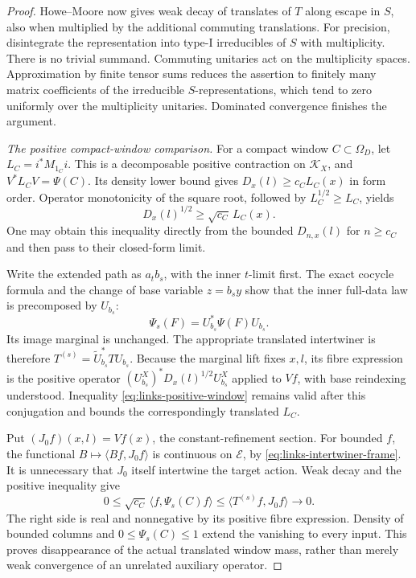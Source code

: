 \begin{proof}
Howe--Moore now gives weak decay of translates of \(T\) along
escape in \(S\), also when multiplied by the additional
commuting translations. For precision, disintegrate the
representation into type-I irreducibles of \(S\) with
multiplicity. There is no trivial summand. Commuting unitaries
act on the multiplicity spaces. Approximation by finite tensor
sums reduces the assertion to finitely many matrix coefficients
of the irreducible \(S\)-representations, which tend to zero
uniformly over the multiplicity unitaries. Dominated convergence
finishes the argument.

\emph{The positive compact-window comparison.}
For a compact window \(C\subset\Omega_D\), let
\(L_C=i^*M_{1_C}i\). This is a decomposable positive contraction
on \(\mathcal K_X\), and
\(V^*L_CV=\Psi(C)\). Its density lower bound gives
\(D_x(l)\geq c_C L_C(x)\) in form order. Operator monotonicity
of the square root, followed by
\(L_C^{1/2}\geq L_C\), yields
\begin{equation}
 D_x(l)^{1/2}\geq\sqrt{c_C}\,L_C(x).
 \label{eq:links-positive-window}
\end{equation}
One may obtain this inequality directly from the bounded
\(D_{n,x}(l)\) for \(n\geq c_C\) and then pass to their
closed-form limit.

Write the extended path as \(a_t b_s\), with the inner
\(t\)-limit first. The exact cocycle formula and the change of
base variable \(z=b_sy\) show that the inner full-data law is
precomposed by \(U_{b_s}\):
\[
 \Psi_s(F)=U_{b_s}^*\Psi(F)U_{b_s}.
\]
Its image marginal is unchanged. The appropriate translated
intertwiner is therefore
\(T^{(s)}=\widetilde U_{b_s}^*TU_{b_s}\).
Because the marginal lift fixes \(x,l\), its fibre expression
is the positive operator
\((U_{b_s}^X)^*D_x(l)^{1/2}U_{b_s}^X\) applied to \(Vf\),
with base reindexing understood. Inequality
\eqref{eq:links-positive-window} remains valid after this
conjugation and bounds the correspondingly translated \(L_C\).

Put \((J_0f)(x,l)=Vf(x)\), the constant-refinement section.
For bounded \(f\), the functional
\(B\mapsto\langle Bf,J_0f\rangle\) is continuous on
\(\mathscr E\), by \eqref{eq:links-intertwiner-frame}.
It is unnecessary that \(J_0\) itself intertwine the target
action. Weak decay and the positive inequality give
\[
 0\leq\sqrt{c_C}\,\langle f,\Psi_s(C)f\rangle
       \leq\langle T^{(s)}f,J_0f\rangle\longrightarrow0.
\]
The right side is real and nonnegative by its positive fibre
expression. Density of bounded columns and
\(0\leq\Psi_s(C)\leq1\) extend the vanishing to every input.
This proves disappearance of the actual translated window mass,
rather than merely weak convergence of an unrelated auxiliary
operator.


\end{proof}
